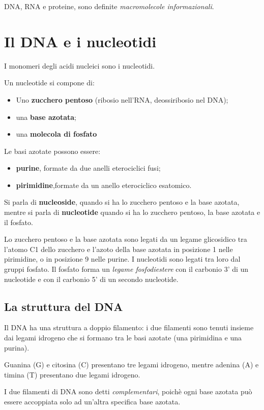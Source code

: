 \documentclass[11pt]{book}
\begin{document}
DNA, RNA e proteine, sono definite \emph{macromolecole informazionali}.

\section{Il DNA e i nucleotidi} 
I monomeri degli acidi nucleici sono i nucleotidi.

Un nucleotide si compone di: 
\begin{itemize}
\item Uno \textbf{zucchero pentoso} (ribosio nell’RNA, deossiribosio nel DNA);
\item una \textbf{base azotata};
\item una \textbf{molecola di fosfato} 
\end{itemize}

Le basi azotate possono essere:
\begin{itemize}
\item \textbf{purine}, formate da due anelli eterociclici fusi; 
\item \textbf{pirimidine},formate da un anello eterociclico esatomico.
\end{itemize}

Si parla di \textbf{nucleoside}, quando si ha lo zucchero pentoso e la base azotata, mentre si parla di \textbf{nucleotide} quando si ha lo zucchero pentoso, la base azotata e il fosfato. 

\vspace{1em}
Lo zucchero pentoso e la base azotata sono legati da un legame glicosidico tra l’atomo C1 dello zucchero e l’azoto della base azotata in posizione 1 nelle pirimidine, o in posizione 9 nelle purine.
I nucleotidi sono legati tra loro dal gruppi fosfato. 
Il fosfato forma un \emph{legame fosfodiestere} con il carbonio 3’ di un nucleotide e con il carbonio 5’ di un secondo nucleotide.

\clearpage
\subsection{La struttura del DNA}
Il DNA ha una struttura a doppio filamento: i due filamenti sono tenuti insieme dai legami idrogeno che si formano tra le basi azotate (una pirimidina e una purina). 

Guanina (G) e citosina (C) presentano tre legami idrogeno, mentre adenina (A) e timina (T) presentano due legami idrogeno.

I due filamenti di DNA sono detti \emph{complementari}, poichè ogni base azotata può essere accoppiata solo ad un'altra specifica base azotata.
\end{document}
